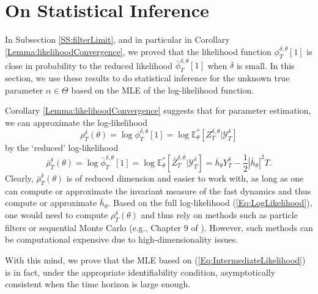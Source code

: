 \documentclass{article}
\begin{document}

\section{On Statistical Inference}\label{S:ParameterEstimation}
In Subsection \ref{SS:filterLimit}, and in particular in Corollary \ref{Lemma:likelihoodConvergence}, we proved that the likelihood function $\phi^{\delta,\theta}_{T}[1]$ is close in
probability to the reduced likelihood $\bar{\phi}^{\delta,\theta}_{T}[1]$ when $\delta$ is small. In this section, we use these results to do statistical inference for the unknown true parameter $\alpha\in\Theta$  based on the MLE of the log-likelihood function.

Corollary \ref{Lemma:likelihoodConvergence} suggests that for parameter estimation, we can approximate the log-likelihood
\begin{equation}
\rho_T^\delta(\theta)=\log \phi^{\delta,\theta}_{T}[1]=\log\mathbb{E}_{\theta}^{*}\left[ Z_T^{\delta,\theta} \Big |\mathcal{Y}^{\delta}_T\right]\label{Eq:LogLikelihood}
\end{equation}
by the `reduced' log-likelihood
\begin{equation}
\bar{\rho}_T^\delta(\theta)=\log \bar{\phi}^{\delta,\theta}_{T}[1]=\log \mathbb{E}_{\theta}^{*}\left[ \bar{Z}_T^{\delta,\theta} \Big |\mathcal{Y}^{\delta}_T\right]=\bar h_{\theta} Y_T^\delta-\frac 12|\bar h_{\theta}|^2 T.\label{Eq:IntermediateLikelihood}
\end{equation}
Clearly, $\bar{\rho}_T^\delta(\theta)$ is of reduced dimension and easier to work with, as long as one can compute or approximate the invariant measure of the fast dynamics and thus compute or approximate $\bar h_{\theta}$.
Based on the full log-likelihood (\ref{Eq:LogLikelihood}), one would need to compute $\rho_T^\delta(\theta)$ and thus rely on methods such as particle filters or sequential Monte Carlo (e.g., Chapter 9 of \cite{bainCrisan}). However, such methods can be computational expensive due to high-dimensionality issues.


With this mind, we prove that the MLE based on (\ref{Eq:IntermediateLikelihood}) is in fact, under the appropriate identifiability condition, asymptotically consistent when the time horizon is large enough.
\end{document}
